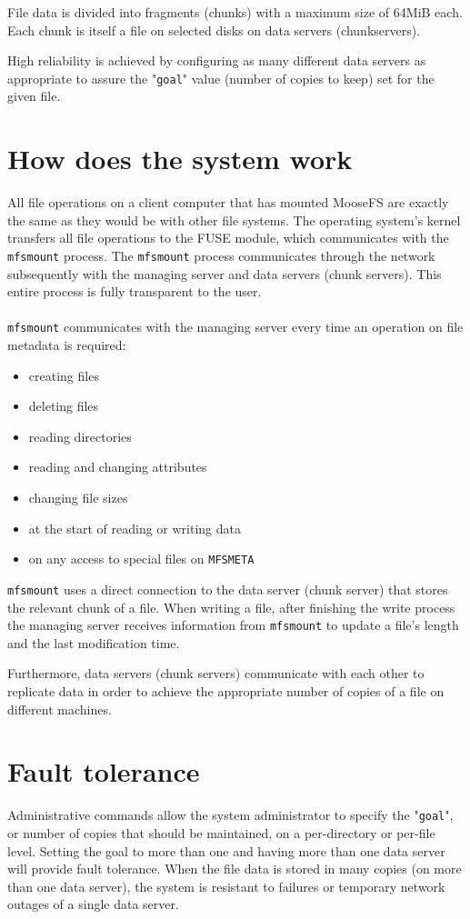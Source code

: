 \documentclass[a4paper,11pt,english]{report}
\def\code#1{\texttt{#1}}
\begin{document}
		File data is divided into fragments (chunks) with a maximum size of 64MiB each. Each chunk is itself a file on selected disks on data servers (chunkservers).
		
High reliability is achieved by configuring as many different data servers as appropriate to assure the "\code{goal}" value (number of copies to keep) set for the given file.
		
		
		\section{How does the system work}
		All file operations on a client computer that has mounted MooseFS are exactly the same as they would be with other file systems. The operating system's kernel transfers all file operations to the FUSE module, which communicates with the \code{mfsmount} process. The \code{mfsmount} process communicates through the network subsequently with the managing server and data servers (chunk servers). This entire process is fully transparent to the user.\\\\
		
		\code{mfsmount} communicates with the managing server every time an operation on file metadata is required:
		\begin{itemize}
			\item creating files
			\item deleting files
			\item reading directories
			\item reading and changing attributes
			\item changing file sizes
			\item at the start of reading or writing data
			\item on any access to special files on \code{MFSMETA}
		\end{itemize}		

		\bigskip
		\code{mfsmount} uses a direct connection to the data server (chunk server) that stores the relevant chunk of a file. When writing a file, after finishing the write process the managing server receives information from \code{mfsmount} to update a file's length and the last modification time.
		
		Furthermore, data servers (chunk servers) communicate with each other to replicate data in order to achieve the appropriate number of copies of a file on different machines.
		
		\section{Fault tolerance}
		Administrative commands allow the system administrator to specify the "\code{goal}", or number of copies that should be maintained, on a per-directory or per-file level. Setting the goal to more than one and having more than one data server will provide fault tolerance. When the file data is stored in many copies (on more than one data server), the system is resistant to failures or temporary network outages of a single data server.
		
\end{document}

